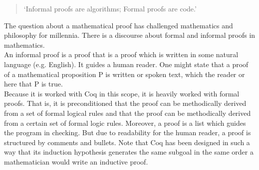 \begin{quote}
`Informal proofs are algorithms; Formal proofs are code.'
\end{quote}
The question about a mathematical proof has challenged mathematics and philosophy for millennia.
There is a discourse about formal and informal proofs in mathematics. \\
An informal proof is a proof that is a proof which is written in some natural language (e.g. English).
It guides a human reader. 
One might state that a proof of a mathematical proposition P is written or spoken  text, which  the reader or here that P is true.\\ 
Because it is worked with Coq in this scope, it is heavily worked with formal proofs.
That is, it is preconditioned that the proof can be methodically derived from a set of formal logical rules and that the proof can be methodically derived from a certain set of formal logic rules.
Moreover, a proof is a list which guides the program in checking. 
But due to readability for the human reader, a proof is structured by comments and bullets.
Note that Coq has been designed in such a way that its induction hypothesis generates the same subgoal in the same order a mathematician would write an inductive proof.                                                                                            









